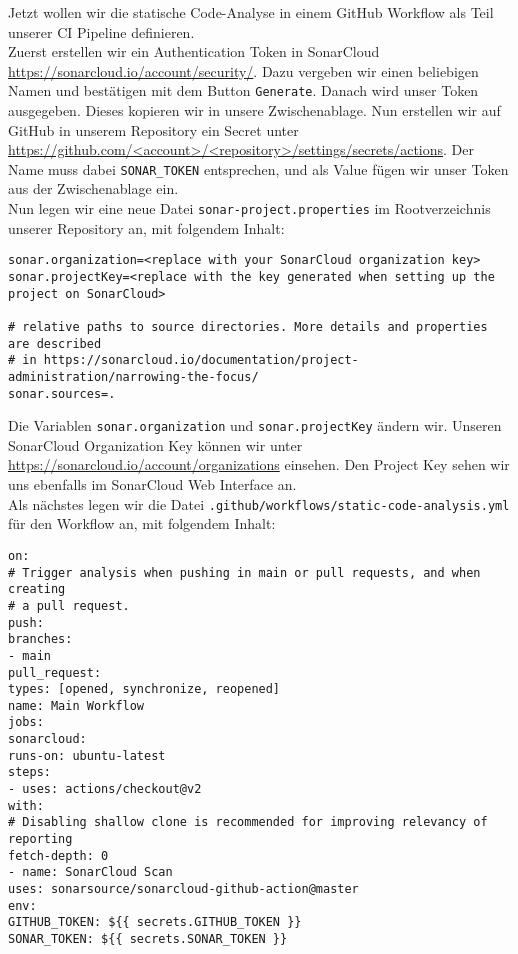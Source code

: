 \noindent
Jetzt wollen wir die statische Code-Analyse in einem
GitHub Workflow als Teil unserer CI Pipeline definieren. \\

\noindent
Zuerst erstellen wir ein Authentication Token in 
SonarCloud \url{https://sonarcloud.io/account/security/}.
Dazu vergeben wir einen beliebigen Namen und bestätigen mit 
dem Button \verb|Generate|.
Danach wird unser Token ausgegeben. 
Dieses kopieren wir in unsere Zwischenablage.
Nun erstellen wir auf GitHub in unserem Repository
ein Secret unter \url{https://github.com/<account>/<repository>/settings/secrets/actions}.
Der Name muss dabei \verb|SONAR_TOKEN| entsprechen,
und als Value fügen wir unser Token aus der Zwischenablage ein. \\

\noindent
Nun legen wir eine neue Datei \verb|sonar-project.properties|
im Rootverzeichnis unserer Repository an, mit folgendem Inhalt:

\begin{verbatim}
sonar.organization=<replace with your SonarCloud organization key>
sonar.projectKey=<replace with the key generated when setting up the project on SonarCloud>

# relative paths to source directories. More details and properties are described
# in https://sonarcloud.io/documentation/project-administration/narrowing-the-focus/
sonar.sources=.
\end{verbatim}

\noindent
Die Variablen \verb|sonar.organization| und
\verb|sonar.projectKey| ändern wir.
Unseren SonarCloud Organization Key können wir unter
\url{https://sonarcloud.io/account/organizations}
einsehen. 
Den Project Key sehen wir uns ebenfalls im SonarCloud 
Web Interface an. \\

\noindent
Als nächstes legen wir die Datei
\verb|.github/workflows/static-code-analysis.yml| 
für den Workflow an, mit folgendem Inhalt:

\begin{verbatim}
on:
# Trigger analysis when pushing in main or pull requests, and when creating
# a pull request.
push:
branches:
- main
pull_request:
types: [opened, synchronize, reopened]
name: Main Workflow
jobs:
sonarcloud:
runs-on: ubuntu-latest
steps:
- uses: actions/checkout@v2
with:
# Disabling shallow clone is recommended for improving relevancy of reporting
fetch-depth: 0
- name: SonarCloud Scan
uses: sonarsource/sonarcloud-github-action@master
env:
GITHUB_TOKEN: ${{ secrets.GITHUB_TOKEN }}
SONAR_TOKEN: ${{ secrets.SONAR_TOKEN }}
\end{verbatim}


